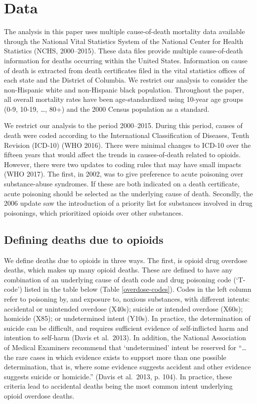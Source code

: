 \documentclass[12pt, a4paper]{article}
\begin{document}
\section{Data}
The analysis in this paper uses multiple cause-of-death mortality data available through the National Vital Statistics System of the National Center for Health Statistics (NCHS, 2000--2015). These data files provide multiple cause-of-death information for deaths occurring within the United States. Information on cause of death is extracted from death certificates filed in the vital statistics offices of each state and the District of Columbia. We restrict our analysis to consider the non-Hispanic white and non-Hispanic black population. Throughout the paper, all overall mortality rates have been age-standardized using 10-year age groups (0-9, 10-19, \dots, 80+) and the 2000 Census population as a standard. 

We restrict our analysis to the period 2000--2015. During this period, causes of death were coded according to the International Classification of Diseases, Tenth Revision (ICD-10) (WHO 2016). There were minimal changes to ICD-10 over the fifteen years that would affect the trends in causes-of-death related to opioids. However, there were two updates to coding rules that may have small impacts (WHO 2017). The first, in 2002, was to give preference to acute poisoning over substance-abuse syndromes. If these are both indicated on a death certificate, acute poisoning should be selected as the underlying cause of death. Secondly, the 2006 update saw the introduction of a priority list for substances involved in drug poisonings, which prioritized opioids over other substances. 

\subsection{Defining deaths due to opioids}
We define deaths due to opioids in three ways. The first, is opioid drug overdose deaths, which makes up many opioid deaths. These are defined to have any combination of an underlying cause of death code and drug poisoning code (`T-code') listed in the table below (Table \ref{overdose-codes}). Codes in the left column refer to poisoning by, and exposure to, noxious substances, with different intents: accidental or unintended overdose (X40s); suicide or intended overdose (X60s); homicide (X85); or undetermined intent (Y10s). In practice, the determination of suicide can be difficult, and requires sufficient evidence of self-inflicted harm and intention to self-harm (Davis et al.\ 2013). In addition, the National Association of Medical Examiners recommend that `undetermined' intent be reserved for ``\dots the rare cases in which evidence exists to support more than one possible determination, that is, where some evidence suggests accident and other evidence suggests suicide or homicide.'' (Davis et al.\ 2013, p. 104). In practice, these criteria lead to accidental deaths being the most common intent underlying opioid overdose deaths. 
\end{document}
